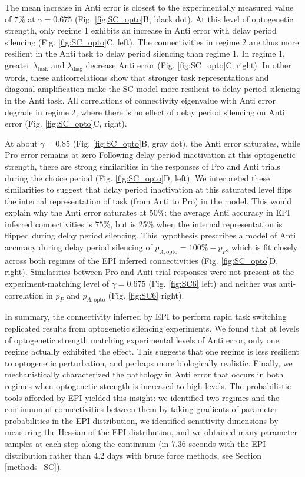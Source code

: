 \documentclass[11pt]{article}
\begin{document}
The mean increase in Anti error is closest to the experimentally measured value of 7\% at $\gamma = 0.675$ (Fig. \ref{fig:SC_opto}B, black dot).  
At this level of optogenetic strength, only regime 1 exhibits an increase in Anti error with delay period silencing (Fig. \ref{fig:SC_opto}C, left).
The connectivities in regime 2 are thus more resilient in the Anti task to delay period silencing than regime 1.
In regime 1, greater $\lambda_{\text{task}}$ and $\lambda_{\text{diag}}$ decrease Anti error (Fig. \ref{fig:SC_opto}C, right).
In other words, these anticorrelations show that stronger task representations and diagonal amplification make the SC model more resilient to delay period silencing in the Anti task.
All correlations of connectivity eigenvalue with Anti error degrade in regime 2, where there is no effect of delay period silencing on Anti error (Fig. \ref{fig:SC_opto}C, right).

At about $\gamma = 0.85$ (Fig. \ref{fig:SC_opto}B, gray dot), the Anti error saturates, while Pro error remains at zero
Following delay period inactivation at this optogenetic strength, there are strong similarities in the responses of Pro and Anti trials during the choice period (Fig. \ref{fig:SC_opto}D, left).
We interpreted these similarities to suggest that delay period inactivation at this saturated level flips the internal representation of task (from Anti to Pro) in the model.
This would explain why the Anti error saturates at 50\%: the average Anti accuracy in EPI inferred connectivities is $75\%$, but is 25\% when the internal representation is flipped during delay period silencing.
This hypothesis prescribes a model of Anti accuracy during delay period silencing of $p_{A,\text{opto}} = 100\% - p_P$, which is fit closely across both regimes of the EPI inferred connectivities (Fig. \ref{fig:SC_opto}D, right).
Similarities between Pro and Anti trial responses were not present at the experiment-matching level of $\gamma=0.675$ (Fig. \ref{fig:SC6} left) and neither was anti-correlation in $p_P$ and $p_{A,\text{opto}}$ (Fig. \ref{fig:SC6} right).

In summary, the connectivity inferred by EPI to perform rapid task switching replicated  results from optogenetic silencing experiments.
We found that at levels of optogenetic strength matching experimental levels of Anti error, only one regime actually exhibited the effect.  
This suggests that one regime is less resilient to optogenetic perturbation, and perhaps more biologically realistic.
Finally, we mechanistically characterized the pathology in Anti error that occurs in both regimes when optogenetic strength is increased to high levels.
The probabilistic tools afforded by EPI yielded this insight: we identified two regimes and the continuum of connectivities between them by taking gradients of parameter probabilities in the EPI distribution, we identified sensitivity dimensions by measuring the Hessian of the EPI distribution, and we obtained many parameter samples at each step along the continuum (in 7.36 seconds with the EPI distribution rather than 4.2 days with brute force methods, see Section \ref{methods_SC}).
\end{document}
